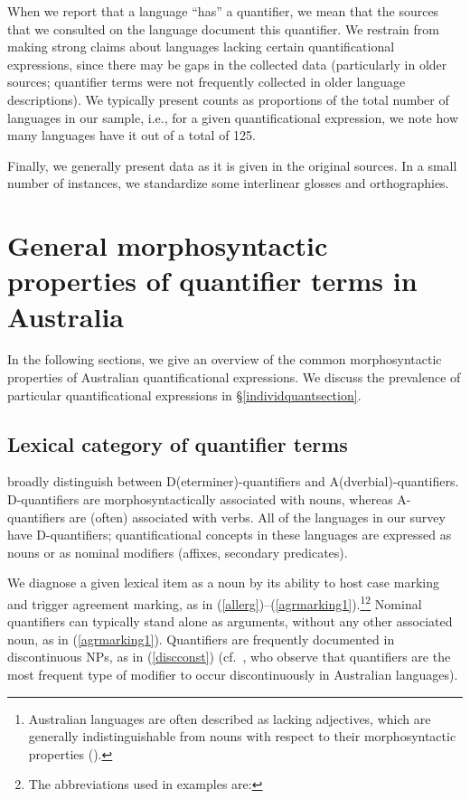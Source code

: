 \documentclass[12pt,egregdoesnotlikesansseriftitles]{scrartcl}
\begin{document}
When we report that a language ``has'' a quantifier, we mean that the sources that we consulted on the language document this quantifier. We restrain from making strong claims about languages lacking certain quantificational
expressions, since there may be gaps in the collected data (particularly in older sources; quantifier terms were not frequently collected in older language descriptions). We typically present counts as proportions of the total number of languages in our sample, i.e., for a given quantificational expression, we note how many languages have it out of a total of 125.

Finally, we generally present data as it is given in the original sources. In a small number of  instances, we standardize some interlinear glosses and orthographies.


\section{General morphosyntactic properties of  quantifier terms in Australia}

In the following sections, we give an overview of the common morphosyntactic properties of Australian quantificational expressions. We discuss the prevalence of particular quantificational expressions in \S\ref{individquantsection}.

\subsection{Lexical category of quantifier terms}

\cite{bachetal95} broadly distinguish between D(eterminer)-quantifiers and A(dverbial)-quantifiers. D-quantifiers are morphosyntactically associated with nouns, whereas A-quantifiers are (often) associated with verbs. All of the languages in our survey have D-quantifiers; quantificational concepts in these languages are expressed as nouns or as nominal modifiers (affixes, secondary predicates). 

We diagnose a given lexical item as a noun by its ability to host case marking and trigger agreement marking, as in (\ref{allerg})--(\ref{agrmarking1}).\footnote{Australian languages are often described as lacking adjectives, which are generally indistinguishable from nouns with respect to their morphosyntactic properties (\citealt[67-68]{dixon02}).}\footnote{The abbreviations used in examples are: \printglossary[style=inline,type=\leipzigtype]} Nominal quantifiers can typically stand alone as arguments, without any other associated noun, as in (\ref{agrmarking1}). Quantifiers are frequently documented in discontinuous NPs, as in (\ref{discconst}) (cf.\ \citealt[51-52]{louagieverstraete16}, who observe that quantifiers are the most frequent type of modifier to occur discontinuously in Australian languages). 
\end{document}
